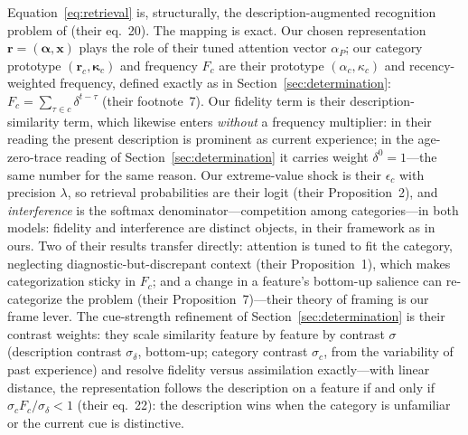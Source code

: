 \documentclass[11pt]{article}
\theoremstyle{plain}
\theoremstyle{remark}
\begin{document}
Equation~\eqref{eq:retrieval} is, structurally, the description-augmented recognition problem of \citet{BordaloGennaioliLanzaniShleifer2026} (their eq.~20). The mapping is exact. Our chosen representation $\mathbf{r}=(\boldsymbol{\alpha},\mathbf{x})$ plays the role of their tuned attention vector $\alpha_P$; our category prototype $(\mathbf{r}_c,\boldsymbol{\kappa}_c)$ and frequency $F_c$ are their prototype $(\alpha_c,\kappa_c)$ and recency-weighted frequency, defined exactly as in Section~\ref{sec:determination}: $F_c=\sum_{\tau\in c}\delta^{t-\tau}$ (their footnote~7). Our fidelity term is their description-similarity term, which likewise enters \emph{without} a frequency multiplier: in their reading the present description is prominent as current experience; in the age-zero-trace reading of Section~\ref{sec:determination} it carries weight $\delta^{0}=1$---the same number for the same reason. Our extreme-value shock is their $\epsilon_c$ with precision $\lambda$, so retrieval probabilities are their logit (their Proposition~2), and \emph{interference} is the softmax denominator---competition among categories---in both models: fidelity and interference are distinct objects, in their framework as in ours. Two of their results transfer directly: attention is tuned to fit the category, neglecting diagnostic-but-discrepant context (their Proposition~1), which makes categorization sticky in $F_c$; and a change in a feature's bottom-up salience can re-categorize the problem (their Proposition~7)---their theory of framing is our frame lever. The cue-strength refinement of Section~\ref{sec:determination} is their contrast weights: they scale similarity feature by feature by contrast $\sigma$ (description contrast $\sigma_\delta$, bottom-up; category contrast $\sigma_c$, from the variability of past experience) and resolve fidelity versus assimilation exactly---with linear distance, the representation follows the description on a feature if and only if $\sigma_{c}F_c/\sigma_{\delta}<1$ (their eq.~22): the description wins when the category is unfamiliar or the current cue is distinctive.
\end{document}
